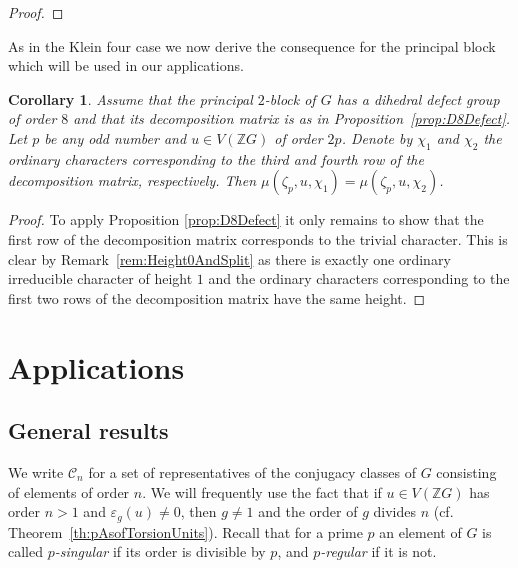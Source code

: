 \documentclass[11pt, a4paper]{amsart}
\newtheorem{corollary}[theorem]{Corollary}
\theoremstyle{definition}
\theoremstyle{definition}
\begin{document}
\begin{proof}
\end{proof}

As in the Klein four case we now derive the consequence for the principal block which will be used in our applications.

\begin{corollary}\label{cor:D8Defect}
Assume that the principal $2$-block of $G$ has a dihedral defect group of order $8$ and that its decomposition matrix is as in Proposition~\ref{prop:D8Defect}. Let $p$ be any odd number and $u \in V(\mathbb{Z}G)$ of order $2p$. 
Denote by $\chi_1$ and $\chi_2$ the ordinary characters corresponding to the third and fourth row of the decomposition matrix, respectively. Then $\mu(\zeta_p, u, \chi_1) = \mu(\zeta_p, u, \chi_2)$.
\end{corollary}
\begin{proof}
To apply Proposition \ref{prop:D8Defect} it only remains to show that the first row of the decomposition matrix corresponds to the trivial character. This is clear by Remark~\ref{rem:Height0AndSplit} as there is exactly one ordinary irreducible character of height $1$ and the ordinary characters corresponding to the first two rows of the decomposition matrix have the same height.
\end{proof}

\section{Applications}

\subsection{General results}
 We write $\mathcal{C}_n$ for a set of representatives of the conjugacy classes of $G$ consisting of elements of order $n$. We will frequently use the fact that if $u \in V(\mathbb{Z}G)$ has order $n > 1$ and $\varepsilon_g(u) \neq 0$, then $g\neq 1$ and the order of $g$ divides $n$ (cf. Theorem~\ref{th:pAsofTorsionUnits}). Recall that for a prime $p$ an element of $G$ is called \emph{$p$-singular} if its order is divisible by $p$, and \emph{$p$-regular} if it is not.
\end{document}
